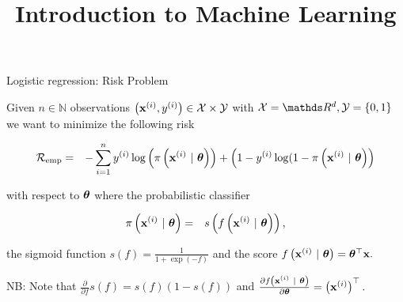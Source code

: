 \documentclass[11pt,compress,t,notes=noshow, xcolor=table]{beamer}
\title{Introduction to Machine Learning}
\begin{document}
    

\begin{vbframe}{Logistic regression: Risk Problem}

Given $n \in \mathbb{N}$ observations $\left(\mathbf{x}^{(i)}, y^{(i)}\right) \in \mathcal{X} \times \mathcal{Y}$ with  $\Xspace = \R^d, \Yspace = \{0, 1\}$ we want to minimize the following risk 


\vspace*{-0.5cm}

\begin{eqnarray*}
  \mathcal{R}_{\text{emp}}  & = & 
  -\sum^n_{i=1} y^{(i)}\log\left(\pi\left(\mathbf{x}^{(i)} ~|~ \bm{\theta}\right)\right) + \left(1-y^{(i)}\log(1-\pi\left(\mathbf{x}^{(i)} ~|~ \bm{\theta}\right)\right)
\end{eqnarray*}

with respect to $\bm{\theta}$ where the probabilistic classifier

\begin{eqnarray*}
  \pi\left(\mathbf{x}^{(i)} ~|~ \bm{\theta}\right)  & = & 
 s\left(f\left(\mathbf{x}^{(i)} ~|~ \bm{\theta}\right)\right),
\end{eqnarray*}

the sigmoid function $s(f) = \frac{1}{1 + \exp(-f)}$ and the score $f\left(\mathbf{x}^{(i)} ~|~ \bm{\theta}\right) = \bm{\theta}^\top \mathbf{x}.$

\vspace*{0.5cm} 

NB: Note that $\frac{\partial}{\partial f} s(f) = s(f)(1-s(f))$ and $\frac{\partial f\left(\mathbf{x}^{(i)} ~|~ \bm{\theta}\right)}{\partial \bm{\theta}} = \left(\mathbf{x}^{(i)}\right)^\top.$

\end{vbframe}
\end{document}
